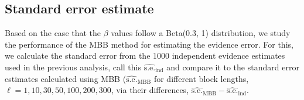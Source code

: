 \documentclass[aps,reprint,amsmath,amssymb,showpacs,showkeys]{revtex4-1}%
\begin{document}
\subsection{Standard error estimate}
\label{subsec:SDest}

Based on the case that the $\beta$ values follow a Beta(0.3, 1) distribution, we study the performance of the MBB method for estimating the evidence error.  For this, we calculate the standard error from the 1000 independent evidence estimates used in the previous analysis, call this $\widehat{\mbox{s.e.}}_{\text{ind}}$ and compare it to the standard error estimates calculated using MBB ($\widehat{\mbox{s.e.}}_{\text{MBB}}$ for different block lengths, $\ell = 1, 10, 30, 50, 100, 200, 300$, via their differences, $\widehat{\mbox{s.e.}}_{\text{MBB}}-\widehat{\mbox{s.e.}}_{\text{ind}}$.  
\end{document}
